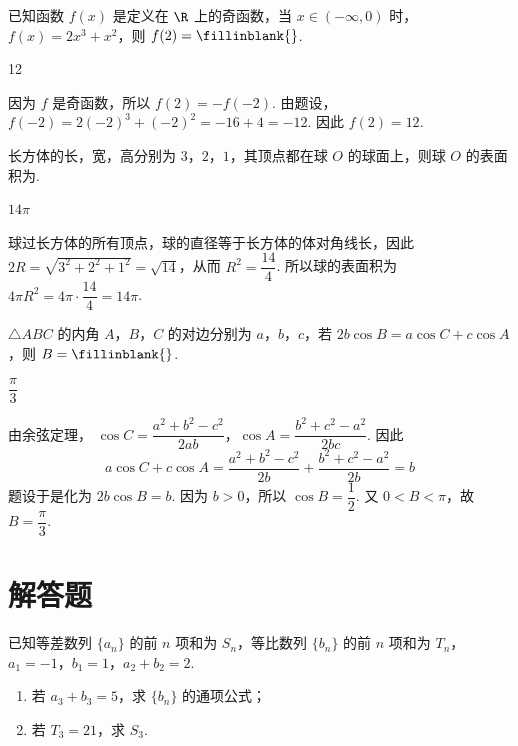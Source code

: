 \begin{problem}
已知函数 \(f(x)\) 是定义在 \(\R\) 上的奇函数，当 \(x\in(-\infty,0)\) 时，\(f(x)=2x^3+x^2\)，则 \(f(2)=\fillinblank{}\).
\end{problem}

\begin{answer}
12
\end{answer}

\begin{solution}
因为 \(f\) 是奇函数，所以 \(f(2)=-f(-2)\). 由题设，
\(f(-2)=2(-2)^3+(-2)^2=-16+4=-12\).
因此 \(f(2)=12\).
\end{solution}

\begin{problem}
长方体的长，宽，高分别为 \(3\)，\(2\)，\(1\)，其顶点都在球 \(O\) 的球面上，则球 \(O\) 的表面积为\fillinblank{}.
\end{problem}

\begin{answer}
\(14\pi\)
\end{answer}

\begin{solution}
球过长方体的所有顶点，球的直径等于长方体的体对角线长，因此
\(2R=\sqrt{3^2+2^2+1^2}=\sqrt{14}\)，从而 \(R^2=\dfrac{14}{4}\).
所以球的表面积为 \(4\pi R^2=4\pi\cdot\dfrac{14}{4}=14\pi\).
\end{solution}

\begin{problem}
\(\triangle ABC\) 的内角 \(A\)，\(B\)，\(C\) 的对边分别为 \(a\)，\(b\)，\(c\)，若 \(2b\cos B=a\cos C+c\cos A\)，则 \(B=\fillinblank{}\).
\end{problem}

\begin{answer}
\(\dfrac{\pi}{3}\)
\end{answer}

\begin{solution}
由余弦定理，
\(\cos C=\dfrac{a^2+b^2-c^2}{2ab}\)，\(\cos A=\dfrac{b^2+c^2-a^2}{2bc}\).
因此
\[
a\cos C+c\cos A
=\frac{a^2+b^2-c^2}{2b}+\frac{b^2+c^2-a^2}{2b}=b
\]
题设于是化为 \(2b\cos B=b\). 因为 \(b>0\)，所以 \(\cos B=\dfrac12\).
又 \(0<B<\pi\)，故 \(B=\dfrac\pi3\).
\end{solution}

\section{解答题}

\begin{problem}
已知等差数列 \(\{a_n\}\) 的前 \(n\) 项和为 \(S_n\)，等比数列 \(\{b_n\}\) 的前 \(n\) 项和为 \(T_n\)，\(a_1=-1\)，\(b_1=1\)，\(a_2+b_2=2\).
\begin{enumerate}
\item 若 \(a_3+b_3=5\)，求 \(\{b_n\}\) 的通项公式；
\item 若 \(T_3=21\)，求 \(S_3\).
\end{enumerate}
\end{problem}

